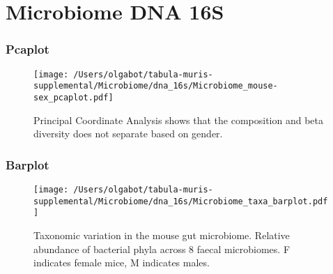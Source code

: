 \clearpage
\section{Microbiome DNA 16S}

\subsubsection{Pcaplot}
\begin{figure}[h]
\centering
\texttt{[image: /Users/olgabot/tabula-muris-supplemental/Microbiome/dna\_16s/Microbiome\_mouse-sex\_pcaplot.pdf]}

\caption{Principal Coordinate Analysis shows that the composition and beta diversity does not separate based on gender.}
\end{figure}


\clearpage

\subsubsection{Barplot}
\begin{figure}[h]
\centering
\texttt{[image: /Users/olgabot/tabula-muris-supplemental/Microbiome/dna\_16s/Microbiome\_taxa\_barplot.pdf]}

\caption{Taxonomic variation in the mouse gut microbiome. Relative abundance of bacterial phyla across 8 faecal microbiomes. F indicates female mice, M indicates males.
}
\end{figure}

